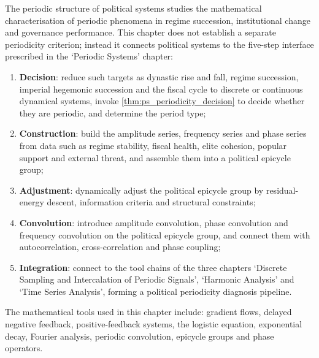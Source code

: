 \begin{remark}\label{rem:politics_five_steps_positioning}
The periodic structure of political systems studies the mathematical characterisation of periodic phenomena in regime succession, institutional change and governance performance. This chapter does not establish a separate periodicity criterion; instead it connects political systems to the five-step interface prescribed in the `Periodic Systems' chapter:
\begin{enumerate}[label=(\arabic*)]
    \item \textbf{Decision}: reduce such targets as dynastic rise and fall, regime succession, imperial hegemonic succession and the fiscal cycle to discrete or continuous dynamical systems, invoke \cref{thm:ps_periodicity_decision} to decide whether they are periodic, and determine the period type;
    \item \textbf{Construction}: build the amplitude series, frequency series and phase series from data such as regime stability, fiscal health, elite cohesion, popular support and external threat, and assemble them into a political epicycle group;
    \item \textbf{Adjustment}: dynamically adjust the political epicycle group by residual-energy descent, information criteria and structural constraints;
    \item \textbf{Convolution}: introduce amplitude convolution, phase convolution and frequency convolution on the political epicycle group, and connect them with autocorrelation, cross-correlation and phase coupling;
    \item \textbf{Integration}: connect to the tool chains of the three chapters `Discrete Sampling and Intercalation of Periodic Signals', `Harmonic Analysis' and `Time Series Analysis', forming a political periodicity diagnosis pipeline.
\end{enumerate}
The mathematical tools used in this chapter include: gradient flows, delayed negative feedback, positive-feedback systems, the logistic equation, exponential decay, Fourier analysis, periodic convolution, epicycle groups and phase operators.
\end{remark}

